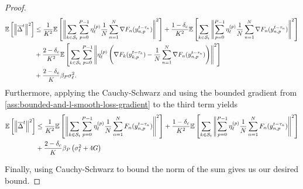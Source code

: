 \begin{proof}
\begin{equation}
\begin{aligned}
            \mathbb{E}\left[ \left\lVert \overline{\Delta}^t \right\rVert^2 \right]
             & \leq \frac{1}{K^2} \mathbb{E}\left[\left\lVert\sum_{k\in \mathcal{S}_t} \sum_{p=0}^{P-1} \eta^{(p)}_{\ell} \frac{1}{N} \sum_{n = 1}^N \nabla F_n(y^{t-\tau_n}_{n,p}) \right\rVert^2\right] + \frac{1-\delta_c}{K^2} \mathbb{E}\left[\sum_{k\in \mathcal{S}_t} \left\lVert\sum_{p=0}^{P-1} \eta^{(p)}_{\ell} \frac{1}{N} \sum_{n = 1}^N \nabla F_n(y^{t-\tau_n}_{n,p}) \right\rVert^2\right] \\
             & + \frac{2-\delta_c}{K^2} \mathbb{E}\left[ \sum_{k\in \mathcal{S}_t} \sum_{p=0}^{P-1} \left\lVert \eta^{(p)}_{\ell} \left( \nabla F_k(y^{t-\tau_k}_{k,p}) - \frac{1}{N} \sum_{n = 1}^N  \nabla F_n(y^{t-\tau_n}_{n,p}) \right) \right\rVert^2\right]                                                                                                    \\
             & + \frac{2 - \delta_c}{K} \beta_P \sigma_{\ell}^2.
        \end{aligned}
    \end{equation}
    Furthermore, applying the Cauchy-Schwarz and using the bounded gradient from \cref{ass:bounded-and-l-smooth-loss-gradient} to the third term yields
    \begin{equation}
        \begin{aligned}
            \mathbb{E}\left[ \left\lVert \overline{\Delta}^t \right\rVert^2 \right]
             & \leq \frac{1}{K^2} \mathbb{E}\left[\left\lVert\sum_{k\in \mathcal{S}_t} \sum_{p=0}^{P-1} \eta^{(p)}_{\ell} \frac{1}{N} \sum_{n = 1}^N  F_n(y^{t-\tau_n}_{n,p}) \right\rVert^2\right] + \frac{1-\delta_c}{K^2} \mathbb{E}\left[\sum_{k\in \mathcal{S}_t} \left\lVert\sum_{p=0}^{P-1} \eta^{(p)}_{\ell} \frac{1}{N} \sum_{n = 1}^N  F_n(y^{t-\tau_n}_{n,p}) \right\rVert^2\right] \\
             & + \frac{2-\delta_c}{K} \beta_P \left(\sigma_{\ell}^2 + 4G\right)                                                                                                                                                                                                                                      \\
        \end{aligned}
    \end{equation}

    Finally, using Cauchy-Schwarz to bound the norm of the sum gives us our desired bound.
\end{proof}